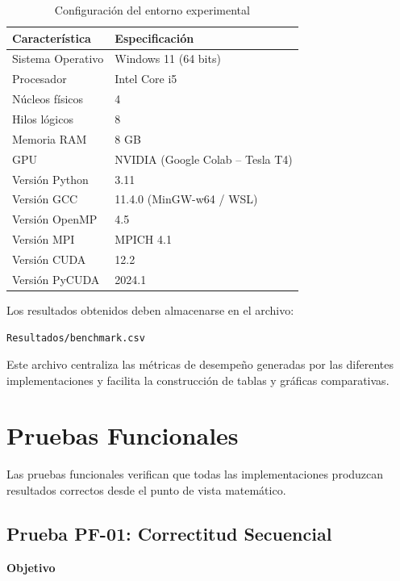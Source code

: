 \begin{table}[H]
\centering
\caption{Configuración del entorno experimental}
\begin{tabular}{ll}
\toprule
Característica & Especificación \\
\midrule
Sistema Operativo  & Windows 11 (64 bits) \\
Procesador         & Intel Core i5 \\
Núcleos físicos     & 4 \\
Hilos lógicos       & 8 \\
Memoria RAM         & 8 GB \\
GPU                 & NVIDIA (Google Colab -- Tesla T4) \\
Versión Python      & 3.11 \\
Versión GCC         & 11.4.0 (MinGW-w64 / WSL) \\
Versión OpenMP      & 4.5 \\
Versión MPI         & MPICH 4.1 \\
Versión CUDA        & 12.2 \\
Versión PyCUDA      & 2024.1 \\
\bottomrule
\end{tabular}
\end{table}

Los resultados obtenidos deben almacenarse en el archivo:

\begin{center}
\texttt{Resultados/benchmark.csv}
\end{center}

Este archivo centraliza las métricas de desempeño generadas por las diferentes implementaciones y facilita la construcción de tablas y gráficas comparativas.

\section{Pruebas Funcionales}

Las pruebas funcionales verifican que todas las implementaciones produzcan resultados correctos desde el punto de vista matemático.

\subsection{Prueba PF-01: Correctitud Secuencial}

\textbf{Objetivo}

